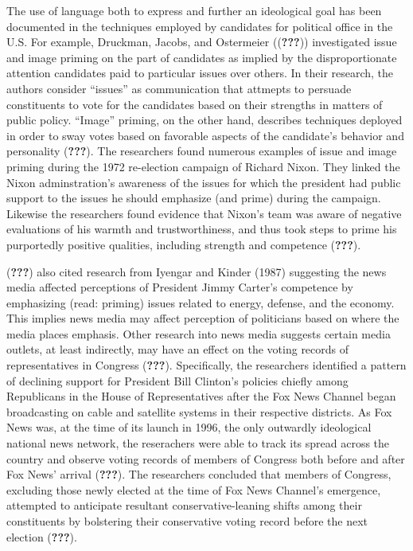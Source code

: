 \documentclass[,man]{apa6}
\theoremstyle{definition}
\theoremstyle{definition}
\theoremstyle{definition}
\theoremstyle{remark}
\begin{document}
The use of language both to express and further an ideological goal has
been documented in the techniques employed by candidates for political
office in the U.S. For example, Druckman, Jacobs, and Ostermeier
(({\textbf{???}})) investigated issue and image priming on the part of
candidates as implied by the disproportionate attention candidates paid
to particular issues over others. In their research, the authors
consider \enquote{issues} as communication that attmepts to persuade
constituents to vote for the candidates based on their strengths in
matters of public policy. \enquote{Image} priming, on the other hand,
describes techniques deployed in order to sway votes based on favorable
aspects of the candidate's behavior and personality ({\textbf{???}}).
The researchers found numerous examples of issue and image priming
during the 1972 re-election campaign of Richard Nixon. They linked the
Nixon adminstration's awareness of the issues for which the president
had public support to the issues he should emphasize (and prime) during
the campaign. Likewise the researchers found evidence that Nixon's team
was aware of negative evaluations of his warmth and trustworthiness, and
thus took steps to prime his purportedly positive qualities, including
strength and competence ({\textbf{???}}).

({\textbf{???}}) also cited research from Iyengar and Kinder (1987)
suggesting the news media affected perceptions of President Jimmy
Carter's competence by emphasizing (read: priming) issues related to
energy, defense, and the economy. This implies news media may affect
perception of politicians based on where the media places emphasis.
Other research into news media suggests certain media outlets, at least
indirectly, may have an effect on the voting records of representatives
in Congress ({\textbf{???}}). Specifically, the researchers identified a
pattern of declining support for President Bill Clinton's policies
chiefly among Republicans in the House of Representatives after the Fox
News Channel began broadcasting on cable and satellite systems in their
respective districts. As Fox News was, at the time of its launch in
1996, the only outwardly ideological national news network, the
reserachers were able to track its spread across the country and observe
voting records of members of Congress both before and after Fox News'
arrival ({\textbf{???}}). The researchers concluded that members of
Congress, excluding those newly elected at the time of Fox News
Channel's emergence, attempted to anticipate resultant
conservative-leaning shifts among their constituents by bolstering their
conservative voting record before the next election ({\textbf{???}}).
\end{document}
